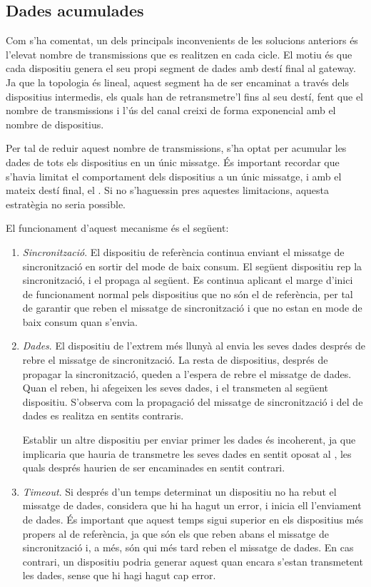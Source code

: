\documentclass{tfgitic}[2024/07/01]
\begin{document}
{\subsection{Dades acumulades}
Com s'ha comentat, un dels principals inconvenients de les solucions anteriors és l'elevat nombre de transmissions que es realitzen en cada cicle. El motiu és que cada dispositiu genera el seu propi segment de dades amb destí final al gateway. Ja que la topologia és lineal, aquest segment ha de ser encaminat a través dels dispositius intermedis, els quals han de retransmetre'l fins al seu destí, fent que el nombre de transmissions i l'ús del canal creixi de forma exponencial amb el nombre de dispositius. 

Per tal de reduir aquest nombre de transmissions, s'ha optat per acumular les dades de tots els dispositius en un únic missatge. És important recordar que s'havia limitat el comportament dels dispositius a un únic missatge, i amb el mateix destí final, el . Si no s'haguessin pres aquestes limitacions, aquesta estratègia no seria possible.

El funcionament d'aquest mecanisme és el següent:
\begin{enumerate}
    \item \emph{Sincronització}. El dispositiu de referència continua enviant el missatge de sincronització en sortir del mode de baix consum. El següent dispositiu rep la sincronització, i el propaga al següent. Es continua aplicant el marge d'inici de funcionament normal pels dispositius que no són el de referència, per tal de garantir que reben el missatge de sincronització i que no estan en mode de baix consum quan s'envia.
    \item \emph{Dades}. El dispositiu de l'extrem més llunyà al  envia les seves dades després de rebre el missatge de sincronització. La resta de dispositius, després de propagar la sincronització, queden a l'espera de rebre el missatge de dades. Quan el reben, hi afegeixen les seves dades, i el transmeten al següent dispositiu. S'observa com la propagació del missatge de sincronització i del de dades es realitza en sentits contraris.
    
    Establir un altre dispositiu per enviar primer les dades és incoherent, ja que implicaria que hauria de transmetre les seves dades en sentit oposat al , les quals després haurien de ser encaminades en sentit contrari.

    \item \emph{Timeout}. Si després d'un temps determinat un dispositiu no ha rebut el missatge de dades, considera que hi ha hagut un error, i inicia ell l'enviament de dades. És important que aquest temps sigui superior en els dispositius més propers al de referència, ja que són els que reben abans el missatge de sincronització i, a més, són qui més tard reben el missatge de dades. En cas contrari, un dispositiu podria generar aquest  quan encara s'estan transmetent les dades, sense que hi hagi hagut cap error. 


\end{enumerate}}
\end{document}
